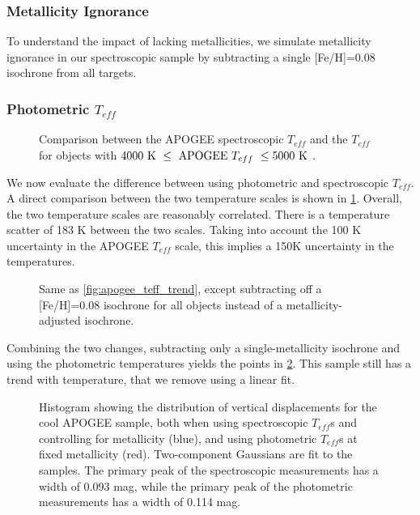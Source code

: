 \documentclass[manuscript]{aastex6}
\newcommand{\Teff}{\ensuremath{T_{eff}}}
\begin{document}
\subsubsection{Metallicity Ignorance}

To understand the impact of lacking metallicities, we simulate metallicity
ignorance in our spectroscopic sample by subtracting a single [Fe/H]=0.08
isochrone from all targets. 

\subsubsection{Photometric \Teff{}}

\begin{figure}[htb]
    \centering
    \caption{Comparison between the APOGEE spectroscopic \Teff{} and the
        \citet{Pinsonneault12} \Teff{} for objects with \(4000 \textrm{ K } \le
    \textrm{ APOGEE \Teff{} } \le 5000 \textrm{ K }\).}\label{fig:teffdiff}
\end{figure}

We now evaluate the difference between using photometric and spectroscopic
\Teff{}. A direct comparison between the two temperature scales is shown in 
\cref{fig:teffdiff}. Overall, the two temperature scales are reasonably
correlated. There is a temperature scatter of 183 K between the two scales.
Taking into account the 100 K uncertainty in the APOGEE \Teff{} scale, this
implies a 150K uncertainty in the \citep{Pinsonneault12} temperatures. 

\begin{figure}[htb]
    \centering
    \caption{Same as \cref{fig:apogee_teff_trend}, except subtracting off a
    [Fe/H]=0.08 isochrone for all objects instead of a metallicity-adjusted
isochrone.}\label{fig:photuncor}
\end{figure}

Combining the two changes, subtracting only a single-metallicity isochrone and
using the photometric temperatures yields the points in \cref{fig:photuncor}.
This sample still has a trend with temperature, that we remove using a linear
fit.

\begin{figure}[htb]
    \centering
    \caption{Histogram showing the distribution of vertical displacements for
        the cool APOGEE sample, both when using spectroscopic \Teff{}s and
    controlling for metallicity (blue), and using photometric \Teff{}s at 
fixed metallicity (red). Two-component Gaussians are fit to the samples. The
primary peak of the spectroscopic measurements has a width of 0.093 mag, while
the primary peak of the photometric measurements has a width of 0.114 mag.}
    \label{fig:histcompare}
\end{figure}
\end{document}
